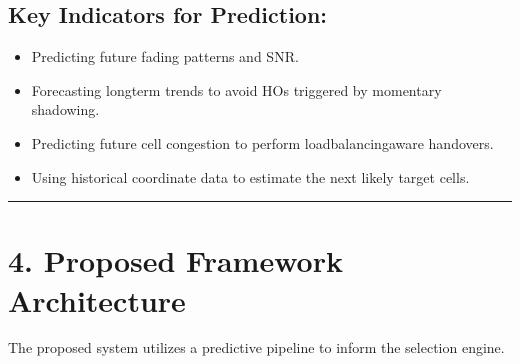 \documentclass[letterpaper,10pt,english]{sphinxmanual}
\begin{document}
\subsection{Key Indicators for Prediction:}
\label{\detokenize{overview:key-indicators-for-prediction}}\begin{itemize}
\item {} 
\sphinxAtStartPar
{} Predicting future fading patterns and SNR.

\item {} 
\sphinxAtStartPar
{} Forecasting long\sphinxhyphen{}term trends to avoid HOs triggered by momentary shadowing.

\item {} 
\sphinxAtStartPar
{} Predicting future cell congestion to perform load\sphinxhyphen{}balancing\sphinxhyphen{}aware handovers.

\item {} 
\sphinxAtStartPar
{} Using historical coordinate data to estimate the next likely target cells.

\end{itemize}


\bigskip\hrule\bigskip



\section{4. Proposed Framework Architecture}
\label{\detokenize{overview:proposed-framework-architecture}}
\sphinxAtStartPar
The proposed system utilizes a predictive pipeline to inform the selection engine.
\end{document}
